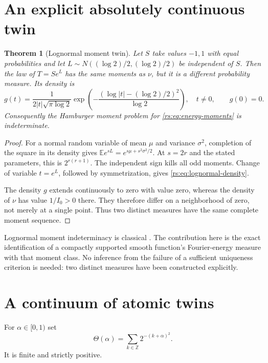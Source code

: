 \documentclass[11pt,a4paper,oneside,openany]{book}
\numberwithin{equation}{chapter}
\newtheorem{theorem}{Theorem}[chapter]
\theoremstyle{definition}
\theoremstyle{remark}
\newcommand{\Z}{\mathbb Z}
\newcommand{\E}{\mathbb E}
\begin{document}
\section{An explicit absolutely continuous twin}

\begin{theorem}[Lognormal moment twin]\label{rs:thm:lognormal}
Let $S$ take values $-1,1$ with equal probabilities and let
$L\sim N((\log2)/2,(\log2)/2)$ be independent of $S$. Then the
law of $T=S e^L$ has the same moments as $\nu$, but it is a
different probability measure. Its density is
\begin{equation}
 g(t)=\frac1{2|t|\sqrt{\pi\log2}}
       \exp\left(-\frac{(\log|t|-(\log2)/2)^2}{\log2}\right),
 \quad t\ne0,
 \qquad g(0)=0.
 \label{rs:eq:lognormal-density}
\end{equation}
Consequently the Hamburger moment problem for
\eqref{rs:eq:energy-moments} is indeterminate.
\end{theorem}
\begin{proof}
For a normal random variable of mean $\mu$ and variance $\sigma^2$,
completion of the square in its density gives
$\E e^{sL}=e^{s\mu+s^2\sigma^2/2}$. At $s=2r$ and the stated
parameters, this is $2^{r(r+1)}$. The independent sign kills all
odd moments. Change of variable $t=e^L$, followed by symmetrization,
gives \eqref{rs:eq:lognormal-density}.

The density $g$ extends continuously to zero with value zero,
whereas the density of $\nu$ has value $1/I_0>0$ there. They
therefore differ on a neighborhood of zero, not merely at a single
point. Thus two distinct measures have the same complete moment
sequence.
\end{proof}

Lognormal moment indeterminacy is classical \cite{heyde}. The
contribution here is the exact identification of a compactly
supported smooth function's Fourier-energy measure with that
moment class. No inference from the failure of a sufficient
uniqueness criterion is needed: two distinct measures have been
constructed explicitly.

\section{A continuum of atomic twins}

For $\alpha\in[0,1)$ set
\begin{equation}
 \Theta(\alpha)=\sum_{k\in\Z}2^{-(k+\alpha)^2}.
 \label{rs:eq:theta}
\end{equation}
It is finite and strictly positive.
\end{document}
